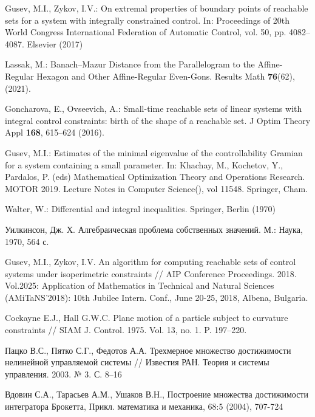 \documentclass[../main.tex]{subfiles}
\begin{document}
\begin{thebibliography}{99}
Gusev, M.I., Zykov, I.V.: On extremal properties of boundary points of reachable sets for a system with integrally constrained control. In: Proceedings of 20th World Congress International Federation of Automatic Control, vol. 50, pp. 4082--4087. Elsevier (2017) 

Lassak, M.: Banach–Mazur Distance from the Parallelogram to the Affine-Regular Hexagon and Other Affine-Regular Even-Gons. Results Math \textbf{76}(62), (2021). 

Goncharova, E., Ovseevich, A.: Small-time reachable sets of linear systems with integral control constraints: birth of the shape of a reachable set. J Optim Theory Appl \textbf{168}, 615--624 (2016).

Gusev, M.I.: Estimates of the minimal eigenvalue of the controllability Gramian for a system containing a small parameter.  In: 
Khachay, M., Kochetov, Y., Pardalos, P. (eds) Mathematical Optimization Theory and Operations Research. MOTOR 
2019. Lecture Notes in Computer Science(), vol 11548. Springer, Cham. 

Walter, W.: Differential and integral inequalities. Springer, Berlin (1970)

Уилкинсон, Дж. Х.
Алгебраическая проблема собственных значений.
М.: Наука, 1970, 564 с.

Gusev, M.I., Zykov, I.V.
An algorithm for computing reachable sets of control systems under isoperimetric constraints // AIP Conference Proceedings. 
2018. 
Vol.2025: Application of Mathematics in Technical and Natural Sciences 
(AMiTaNS'2018): 10th Jubilee Intern. Conf.,
 June 20-25, 2018, Albena, Bulgaria.

 Cockayne E.J., Hall G.W.C. Plane motion of a particle subject to curvature constraints // SIAM J. Control. 1975. Vol. 13, no. 1. P. 197--220.  

 Пацко В.С., Пятко С.Г., Федотов А.А. Трехмерное множество достижимости нелинейной управляемой системы // Известия РАН. Теория и системы управления. 2003. № 3. С. 8--16

 Вдовин С.А., Тарасьев А.М., Ушаков В.Н., Построение множества достижимости интегратора Брокетта, Прикл. математика и механика, 68:5 (2004), 707-724


\end{thebibliography}
\end{document}
